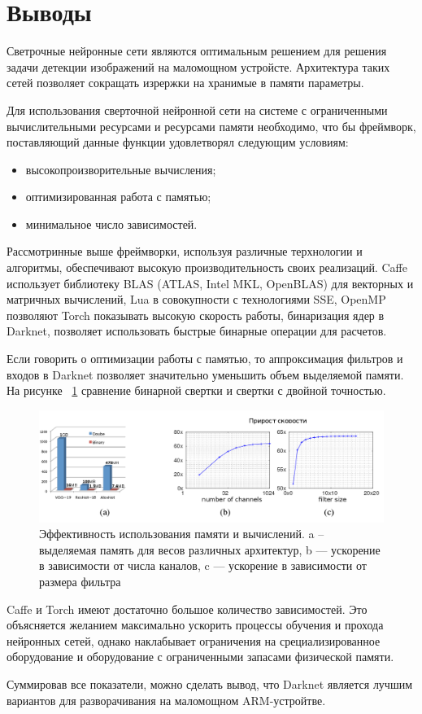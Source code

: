 \documentclass[a4paper,english,russian]{G2-105}
\begin{document}
\section{Выводы}
\par Светрочные нейронные сети являются оптимальным решением для решения задачи детекции изображений на маломощном устройсте. Архитектура таких сетей позволяет сокращать изрержки на хранимые в памяти параметры.
\par Для использования сверточной нейронной сети на системе с ограниченными вычислительными ресурсами и ресурсами памяти необходимо, что бы фреймворк, поставляющий данные функции удовлетворял следующим условиям:
\begin{itemize}
\item высокопроизворительные вычисления;
\item оптимизированная работа с памятью;
\item минимальное число зависимостей.
\end{itemize}
\par Рассмотринные выше фреймворки, используя различные терхнологии и алгоритмы, обеспечивают высокую производительность своих реализаций. Caffe использует библиотеку BLAS (ATLAS, Intel MKL, OpenBLAS) для векторных и матричных вычислений, Lua в совокупности с технологиями SSE, OpenMP позволяют Torch показывать высокую скорость работы, бинаризация ядер в Darknet, позволяет использовать быстрые бинарные операции для расчетов.
\par Если говорить о оптимизации работы с памятью, то аппроксимация фильтров и входов в Darknet позволяет значительно уменьшить объем выделяемой памяти. На рисунке ~\ref{binary_conv} сравнение бинарной свертки и свертки с двойной точностью.
\begin{figure}
\begin{center}
    \includegraphics[width=0.55\paperheight]{binary_conv.png}
    \caption{Эффективность использования памяти и вычислений. a -- выделяемая память для весов различных архитектур, b --- ускорение в зависимости от числа каналов, c --- ускорение в зависимости от размера фильтра}
	\label{binary_conv}
\end{center}
\end{figure}
\par Caffe и Torch имеют достаточно большое количество зависимостей. Это объясняется желанием максимально ускорить процессы обучения и прохода нейронных сетей, однако наклабывает ограничения на срециализированное оборудование и оборудование с ограниченными запасами физической памяти.
\par Суммировав все показатели, можно сделать вывод, что Darknet является лучшим вариантов для разворачивания на маломощном ARM-устройтве.
\end{document}
